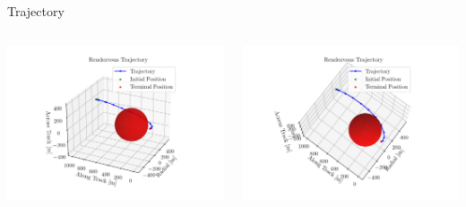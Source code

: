 \documentclass[aspectratio=169]{beamer}
\begin{document}
\begin{frame}{Trajectory}
    \vspace{-0.25cm}
    \begin{columns}[T]
        \begin{column}{.5\textwidth}
            \includegraphics[width=8cm]{img/traj_side.png}
        \end{column}
        \begin{column}{.5\textwidth}
            \includegraphics[width=8cm]{img/traj_top.png}
        \end{column}
    \end{columns}
\end{frame}
\end{document}
